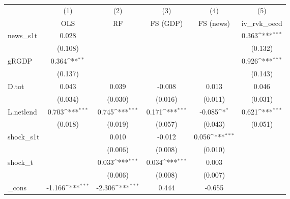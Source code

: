 {
\def\sym#1{\ifmmode^{#1}\else\(^{#1}\)\fi}
\begin{tabular}{l*{5}{c}}
\toprule
            &\multicolumn{1}{c}{(1)}&\multicolumn{1}{c}{(2)}&\multicolumn{1}{c}{(3)}&\multicolumn{1}{c}{(4)}&\multicolumn{1}{c}{(5)}\\
            &\multicolumn{1}{c}{OLS}&\multicolumn{1}{c}{RF}&\multicolumn{1}{c}{FS (GDP)}&\multicolumn{1}{c}{FS (news)}&\multicolumn{1}{c}{iv\_rvk\_oecd}\\
\midrule
news\_s1t    &       0.028         &                     &                     &                     &       0.363\sym{***}\\
            &     (0.108)         &                     &                     &                     &     (0.132)         \\
\addlinespace
gRGDP       &       0.364\sym{**} &                     &                     &                     &       0.926\sym{***}\\
            &     (0.137)         &                     &                     &                     &     (0.143)         \\
\addlinespace
D.tot       &       0.043         &       0.039         &      -0.008         &       0.013         &       0.046         \\
            &     (0.034)         &     (0.030)         &     (0.016)         &     (0.011)         &     (0.031)         \\
\addlinespace
L.netlend   &       0.703\sym{***}&       0.745\sym{***}&       0.171\sym{***}&      -0.085\sym{*}  &       0.621\sym{***}\\
            &     (0.018)         &     (0.019)         &     (0.057)         &     (0.043)         &     (0.051)         \\
\addlinespace
shock\_s1t   &                     &       0.010         &      -0.012         &       0.056\sym{***}&                     \\
            &                     &     (0.006)         &     (0.008)         &     (0.010)         &                     \\
\addlinespace
shock\_t     &                     &       0.033\sym{***}&       0.034\sym{***}&       0.003         &                     \\
            &                     &     (0.006)         &     (0.008)         &     (0.007)         &                     \\
\addlinespace
\_cons      &      -1.166\sym{***}&      -2.306\sym{***}&       0.444         &      -0.655         &                     \\

\end{tabular}}
